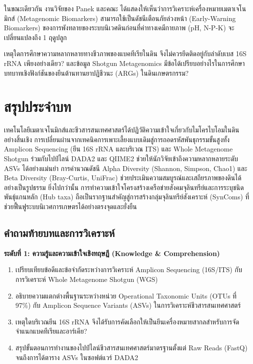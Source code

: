 ในขณะเดียวกัน งานวิจัยของ Panek และคณะ \cite{pmid41800415} ได้แสดงให้เห็นว่าการวิเคราะห์เครื่องหมายเมตาเจโนมิกส์ (Metagenomic Biomarkers) สามารถใช้เป็นดัชนีเตือนภัยล่วงหน้า (Early-Warning Biomarkers) ของการพังทลายของระบบนิเวศดินก่อนที่ค่าทางเคมีกายภาพ (pH, N-P-K) จะเปลี่ยนแปลงถึง 1 ฤดูปลูก

\begin{insight}
เหตุใดการศึกษาความหลากหลายทางชีวภาพของแบคทีเรียในดิน จึงไม่ควรยึดติดอยู่กับลำดับเบส 16S rRNA เพียงอย่างเดียว? และข้อมูล Shotgun Metagenomics มีข้อได้เปรียบอย่างไรในการศึกษาบทบาทเชิงฟังก์ชันของยีนต้านทานยาปฏิชีวนะ (ARGs) ในดินเกษตรกรรม?
\end{insight}

\section*{สรุปประจำบท}

เทคโนโลยีเมตาเจโนมิกส์และชีวสารสนเทศศาสตร์ได้ปฏิวัติความเข้าใจเกี่ยวกับไมโครไบโอมในดินอย่างสิ้นเชิง การเปลี่ยนผ่านจากเทคนิคการเพาะเลี้ยงแบบเดิมสู่การถอดรหัสพันธุกรรมขั้นสูงทั้ง Amplicon Sequencing (ยีน 16S rRNA และบริเวณ ITS) และ Whole Metagenome Shotgun ร่วมกับไปป์ไลน์ DADA2 และ QIIME2 ช่วยให้นักวิจัยเข้าถึงความหลากหลายระดับ ASVs ได้อย่างแม่นยำ การคำนวณดัชนี Alpha Diversity (Shannon, Simpson, Chao1) และ Beta Diversity (Bray-Curtis, UniFrac) ช่วยประเมินความสมบูรณ์และเสถียรภาพของดินได้อย่างเป็นรูปธรรม ยิ่งไปกว่านั้น การทำความเข้าใจโครงสร้างเครือข่ายสังคมจุลินทรีย์และการระบุชนิดพันธุ์แกนหลัก (Hub taxa) ถือเป็นรากฐานสำคัญสู่การสร้างกลุ่มจุลินทรีย์สังเคราะห์ (SynComs) ที่ช่วยฟื้นฟูระบบนิเวศการเกษตรได้อย่างตรงจุดและยั่งยืน

\subsection*{คำถามท้ายบทและการวิเคราะห์}

\noindent \textbf{ระดับที่ 1: ความรู้และความเข้าใจเชิงทฤษฎี (Knowledge \& Comprehension)}
\begin{enumerate}
    \item เปรียบเทียบข้อดีและข้อจำกัดระหว่างการวิเคราะห์ Amplicon Sequencing (16S/ITS) กับการวิเคราะห์ Whole Metagenome Shotgun (WGS)
    \item อธิบายความแตกต่างพื้นฐานระหว่างหน่วย Operational Taxonomic Units (OTUs ที่ 97\%) กับ Amplicon Sequence Variants (ASVs) ในการวิเคราะห์ชีวสารสนเทศศาสตร์
    \item เหตุใดบริเวณยีน 16S rRNA จึงได้รับการคัดเลือกให้เป็นยีนเครื่องหมายสากลสำหรับการจัดจำแนกแบคทีเรียและอาร์เคีย?
    \item สรุปขั้นตอนการทำงานของไปป์ไลน์ชีวสารสนเทศศาสตร์มาตรฐานตั้งแต่ Raw Reads (FastQ) จนถึงการได้ตาราง ASVs ในซอฟต์แวร์ DADA2
\end{enumerate}

